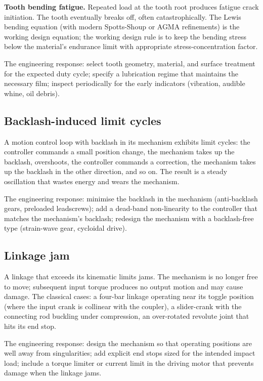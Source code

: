 \textbf{Tooth bending fatigue.} Repeated load at the tooth root produces fatigue crack initiation. The tooth eventually breaks off, often catastrophically. The Lewis bending equation (with modern Spotts-Shoup or AGMA refinements) is the working design equation; the working design rule is to keep the bending stress below the material's endurance limit with appropriate stress-concentration factor.

The engineering response: select tooth geometry, material, and surface treatment for the expected duty cycle; specify a lubrication regime that maintains the necessary film; inspect periodically for the early indicators (vibration, audible whine, oil debris).

\subsection{Backlash-induced limit cycles}

A motion control loop with backlash in its mechanism exhibits limit cycles: the controller commands a small position change, the mechanism takes up the backlash, overshoots, the controller commands a correction, the mechanism takes up the backlash in the other direction, and so on. The result is a steady oscillation that wastes energy and wears the mechanism.

The engineering response: minimise the backlash in the mechanism (anti-backlash gears, preloaded leadscrews); add a dead-band non-linearity to the controller that matches the mechanism's backlash; redesign the mechanism with a backlash-free type (strain-wave gear, cycloidal drive).

\subsection{Linkage jam}

A linkage that exceeds its kinematic limits jams. The mechanism is no longer free to move; subsequent input torque produces no output motion and may cause damage. The classical cases: a four-bar linkage operating near its toggle position (where the input crank is collinear with the coupler), a slider-crank with the connecting rod buckling under compression, an over-rotated revolute joint that hits its end stop.

The engineering response: design the mechanism so that operating positions are well away from singularities; add explicit end stops sized for the intended impact load; include a torque limiter or current limit in the driving motor that prevents damage when the linkage jams.

